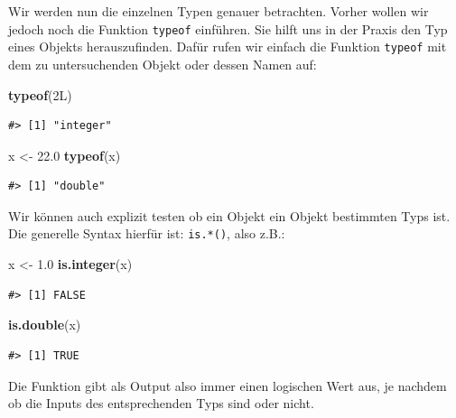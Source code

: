\documentclass[]{book}
\newenvironment{Shaded}{\begin{snugshade}}{\end{snugshade}}
\newcommand{\KeywordTok}[1]{\textcolor[rgb]{0.13,0.29,0.53}{\textbf{#1}}}
\newcommand{\FloatTok}[1]{\textcolor[rgb]{0.00,0.00,0.81}{#1}}
\newcommand{\StringTok}[1]{\textcolor[rgb]{0.31,0.60,0.02}{#1}}
\newcommand{\NormalTok}[1]{#1}
\begin{document}
Wir werden nun die einzelnen Typen genauer betrachten. Vorher wollen wir
jedoch noch die Funktion \texttt{typeof} einführen. Sie hilft uns in der
Praxis den Typ eines Objekts herauszufinden. Dafür rufen wir einfach die
Funktion \texttt{typeof} mit dem zu untersuchenden Objekt oder dessen
Namen auf:

\begin{Shaded}
\begin{Highlighting}[]
\KeywordTok{typeof}\NormalTok{(2L)}
\end{Highlighting}
\end{Shaded}

\begin{verbatim}
#> [1] "integer"
\end{verbatim}

\begin{Shaded}
\begin{Highlighting}[]
\NormalTok{x <-}\StringTok{ }\FloatTok{22.0}
\KeywordTok{typeof}\NormalTok{(x)}
\end{Highlighting}
\end{Shaded}

\begin{verbatim}
#> [1] "double"
\end{verbatim}

Wir können auch explizit testen ob ein Objekt ein Objekt bestimmten Typs
ist. Die generelle Syntax hierfür ist: \texttt{is.*()}, also z.B.:

\begin{Shaded}
\begin{Highlighting}[]
\NormalTok{x <-}\StringTok{ }\FloatTok{1.0}
\KeywordTok{is.integer}\NormalTok{(x)}
\end{Highlighting}
\end{Shaded}

\begin{verbatim}
#> [1] FALSE
\end{verbatim}

\begin{Shaded}
\begin{Highlighting}[]
\KeywordTok{is.double}\NormalTok{(x)}
\end{Highlighting}
\end{Shaded}

\begin{verbatim}
#> [1] TRUE
\end{verbatim}

Die Funktion gibt als Output also immer einen logischen Wert aus, je
nachdem ob die Inputs des entsprechenden Typs sind oder nicht.
\end{document}
